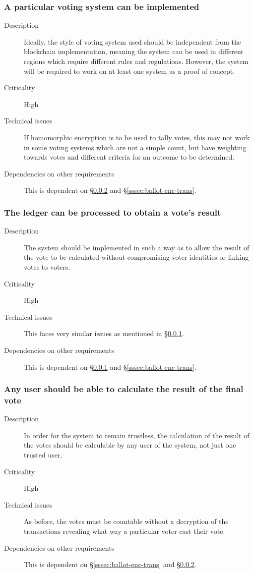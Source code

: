 \documentclass[a4paper,12pt]{article}
\begin{document}
\subsubsection{A particular voting system can be implemented}
\label{sssec:vote-sys-rep}
\begin{description}
	\item[Description]
		Ideally, the style of voting system used should be independent from the blockchain implementation, meaning the system can be used in different regions which require different rules and regulations. However, the system will be required to work on at least one system as a proof of concept.
	\item[Criticality]
		High
	\item[Technical issues]
		If homomorphic encryption is to be used to tally votes, this may not work in some voting systems which are not a simple count, but have weighting towards votes and different criteria for an outcome to be determined.
	\item[Dependencies on other requirements]
		This is dependent on \S\ref{sssec:vote-sys-calc} and \S\ref{sssec:ballot-enc-trans}.
\end{description}

\subsubsection{The ledger can be processed to obtain a vote's result}
\label{sssec:vote-sys-calc}
\begin{description}
	\item[Description]
		The system should be implemented in such a way as to allow the result of the vote to be calculated without compromising voter identities or linking votes to voters.
	\item[Criticality]
		High
	\item[Technical issues]
		This faces very similar issues as mentioned in \S\ref{sssec:vote-sys-rep}.
	\item[Dependencies on other requirements]
		This is dependent on \S\ref{sssec:vote-sys-rep} and \S\ref{sssec:ballot-enc-trans}.
\end{description}

\subsubsection{Any user should be able to calculate the result of the final vote}
\begin{description}
	\item[Description]
		In order for the system to remain trustless, the calculation of the result of the votes should be calculable by any user of the system, not just one trusted user.
	\item[Criticality]
		High
	\item[Technical issues]
		As before, the votes must be countable without a decryption of the transactions revealing what way a particular voter cast their vote.
	\item[Dependencies on other requirements]
		This is dependent on \S\ref{sssec:ballot-enc-trans} and \S\ref{sssec:vote-sys-calc}.
\end{description}
\end{document}
